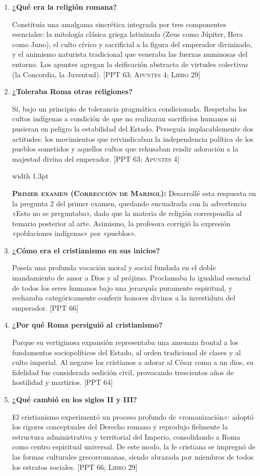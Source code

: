 \documentclass[11pt,letterpaper]{article}
\newcommand{\fuente}[1]{\nolinebreak\hfill{\footnotesize\color{black!55}\textsc{[#1]}}}
\newcommand{\examen}[1]{%
  \par\vspace{0.35em}%
  \noindent\hspace*{0.8em}%
  {\color{goodingCrimson}\vrule width 1.3pt}\hspace{0.7em}%
  \parbox{\dimexpr\linewidth-2.2em}{%
    \footnotesize\color{goodingCrimson}%
    \textbf{\textsc{Primer examen (Corrección de Marisol):}} #1%
  }%
  \par\vspace{0.35em}%
}
\newcommand{\preg}[1]{\item \textbf{#1}\par\nopagebreak\vspace{0.2em}}
\begin{document}
\begin{enumerate}[resume]
  \preg{¿Qué era la religión romana?}
  Constituía una amalgama sincrética integrada por tres componentes esenciales: la mitología clásica griega latinizada (Zeus como Júpiter, Hera como Juno), el culto cívico y sacrificial a la figura del emperador divinizado, y el animismo naturista tradicional que veneraba las fuerzas numinosas del entorno. Los apuntes agregan la deificación abstracta de virtudes colectivas (la Concordia, la Juventud). \fuente{PPT 63; Apuntes 4; Libro 29}

  \preg{¿Toleraba Roma otras religiones?}
  Sí, bajo un principio de tolerancia pragmática condicionada. Respetaba los cultos indígenas a condición de que no realizaran sacrificios humanos ni pusieran en peligro la estabilidad del Estado. Perseguía implacablemente dos actitudes: los movimientos que reivindicaban la independencia política de los pueblos sometidos y aquellos cultos que rehusaban rendir adoración a la majestad divina del emperador. \fuente{PPT 63; Apuntes 4}
  \examen{Desarrollé esta respuesta en la pregunta 2 del primer examen, quedando encuadrada con la advertencia «Esto no se preguntaba», dado que la materia de religión correspondía al temario posterior al arte. Asimismo, la profesora corrigió la expresión «poblaciones indígenas» por «pueblos».}

  \preg{¿Cómo era el cristianismo en sus inicios?}
  Poseía una profunda vocación moral y social fundada en el doble mandamiento de amor a Dios y al prójimo. Proclamaba la igualdad esencial de todos los seres humanos bajo una jerarquía puramente espiritual, y rechazaba categóricamente conferir honores divinos a la investidura del emperador. \fuente{PPT 66}

  \preg{¿Por qué Roma persiguió al cristianismo?}
  Porque su vertiginosa expansión representaba una amenaza frontal a los fundamentos sociopolíticos del Estado, al orden tradicional de clases y al culto imperial. Al negarse los cristianos a adorar al César como a un dios, su fidelidad fue considerada sedición civil, provocando trescientos años de hostilidad y martirios. \fuente{PPT 64}

  \preg{¿Qué cambió en los siglos II y III?}
  El cristianismo experimentó un proceso profundo de «romanización»: adoptó los rigores conceptuales del Derecho romano y reprodujo fielmente la estructura administrativa y territorial del Imperio, consolidando a Roma como centro espiritual universal. De este modo, la fe cristiana se impregnó de las formas culturales grecorromanas, siendo abrazada por miembros de todos los estratos sociales. \fuente{PPT 66; Libro 29}


\end{enumerate}
\end{document}
